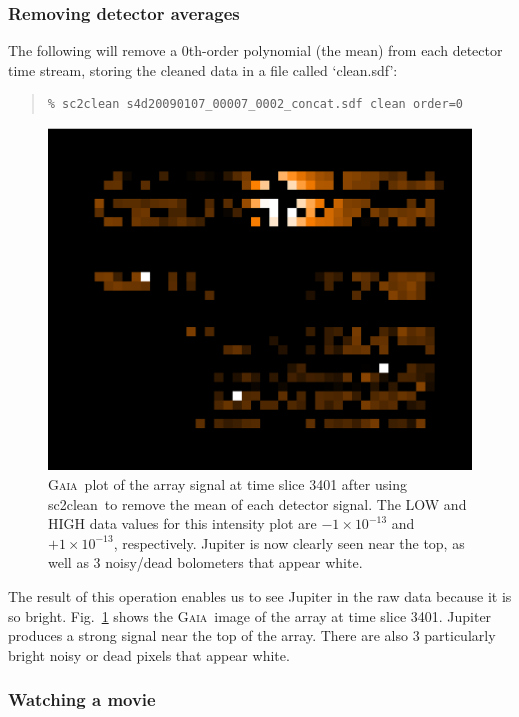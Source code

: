 \documentclass[twoside,11pt]{article}
\newenvironment{myquote}{\begin{quote}\begin{small}}{\end{small}\end{quote}}
\newcommand{\gaia}{\xref{\textsc{Gaia}}{sun214}{}}
\newcommand{\task}[1]{\textsf{#1}}
\newcommand{\clean}{\xref{\task{sc2clean}}{sun258}{SC2CLEAN}}
\newcommand{\xref}[3]{#1}
\newcommand{\xlabel}[1]{}
\renewcommand{\_}{\texttt{\symbol{95}}}
\begin{document}
\subsubsection{\xlabel{clean_average}Removing detector averages} 

The following will remove a 0th-order polynomial (the mean) from each
detector time stream, storing the cleaned data in a file called
`clean.sdf':

\begin{myquote}
\begin{verbatim}
% sc2clean s4d20090107_00007_0002_concat.sdf clean order=0
\end{verbatim}
\end{myquote}

\begin{figure}
\begin{center}
\includegraphics[width=0.5\linewidth]{array_mean}
\caption{\gaia\ plot of the array signal at time slice 3401 after
  using \clean\ to remove the mean of each detector signal. The LOW
  and HIGH data values for this intensity plot are $-1\times10^{-13}$
  and $+1\times10^{-13}$, respectively. Jupiter is now clearly seen
  near the top, as well as 3 noisy/dead bolometers that appear white.}
\label{fig:array_mean}
\end{center}
\end{figure}

The result of this operation enables us to see Jupiter in the raw data
because it is so bright. Fig.~\ref{fig:array_mean} shows the \gaia\
image of the array at time slice 3401. Jupiter produces a strong
signal near the top of the array. There are also 3 particularly bright
noisy or dead pixels that appear white. 

\subsubsection{\xlabel{movie}Watching a movie} 
\end{document}
